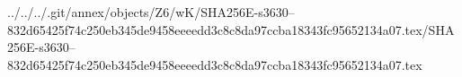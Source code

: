 ../../../.git/annex/objects/Z6/wK/SHA256E-s3630--832d65425f74c250eb345de9458eeeedd3c8c8da97ccba18343fc95652134a07.tex/SHA256E-s3630--832d65425f74c250eb345de9458eeeedd3c8c8da97ccba18343fc95652134a07.tex